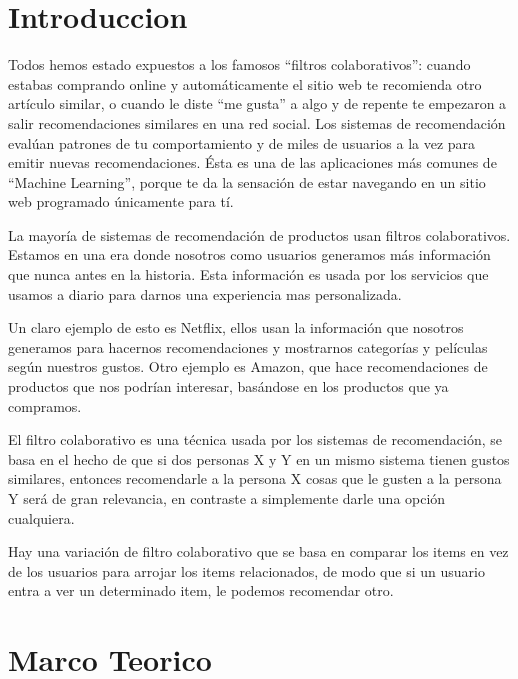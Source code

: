 \documentclass[preprint,12pt]{elsarticle}
\begin{document}
\section{Introduccion}

Todos hemos estado expuestos a los famosos “filtros colaborativos”: cuando estabas comprando online y automáticamente el sitio web te recomienda otro artículo similar, o cuando le diste “me gusta” a algo y de repente te empezaron a salir recomendaciones similares en una red social. Los sistemas de recomendación evalúan patrones de tu comportamiento y de miles de usuarios a la vez para emitir nuevas recomendaciones. Ésta es una de las aplicaciones más comunes de “Machine Learning”, porque te da la sensación de estar navegando en un sitio web programado únicamente para tí.

La mayoría de sistemas de recomendación de productos usan filtros colaborativos. Estamos en una era donde nosotros como usuarios generamos más información que nunca antes en la historia. Esta información es usada por los servicios que usamos a diario para darnos una experiencia mas personalizada.

Un claro ejemplo de esto es Netflix, ellos usan la información que nosotros generamos para hacernos recomendaciones y mostrarnos categorías y películas según nuestros gustos. Otro ejemplo es Amazon, que hace recomendaciones de productos que nos podrían interesar, basándose en los productos que ya compramos.

El filtro colaborativo es una técnica usada por los sistemas de recomendación, se basa en el hecho de que si dos personas X y Y en un mismo sistema tienen gustos similares, entonces recomendarle a la persona X cosas que le gusten a la persona Y será de gran relevancia, en contraste a simplemente darle una opción cualquiera.

Hay una variación de filtro colaborativo que se basa en comparar los items en vez de los usuarios para arrojar los items relacionados, de modo que si un usuario entra a ver un determinado item, le podemos recomendar otro.\\

\pagebreak
	
	

\section{Marco Teorico}
\end{document}
